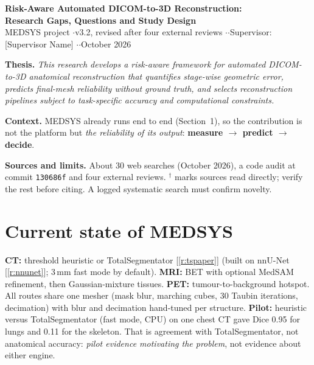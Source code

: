 \documentclass[10pt,a4paper]{article}
\newcommand{\rf}[1]{\ref{#1}}
\newcommand{\pv}{$^\dagger$}
\begin{document}
\color{brandtext}

\begin{center}
{\Large\bfseries Risk-Aware Automated DICOM-to-3D Reconstruction:\\[1pt] Research Gaps, Questions and Study Design}\\[3pt]
{\small\color{brandtext2} MEDSYS project \enspace$\cdot$\enspace v3.2, revised after four external reviews \enspace$\cdot$ \enspace$\cdot$\enspace Supervisor: [Supervisor Name] \enspace$\cdot$ \enspace$\cdot$\enspace October 2026}
\end{center}
\vspace{-5pt}{\color{brandorange}\rule{\linewidth}{1.2pt}}

\textbf{Thesis.} \emph{This research develops a risk-aware framework for automated DICOM-to-3D anatomical reconstruction that quantifies stage-wise geometric error, predicts final-mesh reliability without ground truth, and selects reconstruction pipelines subject to task-specific accuracy and computational constraints.}

\textbf{Context.} MEDSYS already runs end to end (Section~1), so the contribution is not the platform but \emph{the reliability of its output}: \textbf{measure $\rightarrow$ predict $\rightarrow$ decide}.

\textbf{Sources and limits.} About 30 web searches (October 2026), a code audit at commit \texttt{130686f} and four external reviews. \pv{} marks sources read directly; verify the rest before citing. A logged systematic search must confirm novelty.

\section{Current state of MEDSYS}
\textbf{CT:} threshold heuristic or TotalSegmentator [\rf{r:tspaper}] (built on nnU-Net [\rf{r:nnunet}]; 3\,mm fast mode by default). \textbf{MRI:} BET with optional MedSAM refinement, then Gaussian-mixture tissues. \textbf{PET:} tumour-to-background hotspot. All routes share one mesher (mask blur, marching cubes, 30 Taubin iterations, decimation) with blur and decimation hand-tuned per structure. \textbf{Pilot:} heuristic versus TotalSegmentator (fast mode, CPU) on one chest CT gave Dice 0.95 for lungs and 0.11 for the skeleton. That is agreement with TotalSegmentator, not anatomical accuracy: \emph{pilot evidence motivating the problem}, not evidence about either engine.
\end{document}
